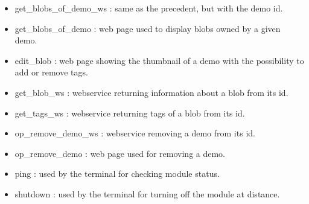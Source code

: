 \begin{itemize}
\item get\_blobs\_of\_demo\_ws : same as the precedent, but with the demo id.
\item get\_blobs\_of\_demo : web page used to display blobs owned by a given demo.
\item edit\_blob : web page showing the thumbnail of a demo with the possibility to add or remove tags.
\item get\_blob\_ws : webservice returning information about a blob from its id.
\item get\_tags\_ws : webservice returning tags of a blob from its id.
\item op\_remove\_demo\_ws : webservice removing a demo from its id.
\item op\_remove\_demo : web page used for removing a demo.
\item ping : used by the terminal for checking module status.
\item shutdown : used by the terminal for turning off the module at distance.
  
\end{itemize}
